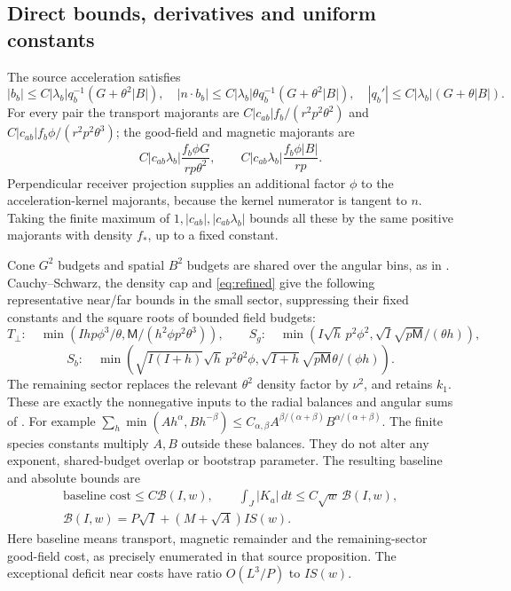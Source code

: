 \documentclass[11pt]{article}
\theoremstyle{remark}\newtheorem{remark}[theorem]{Remark}
\numberwithin{equation}{section}
\begin{document}
\subsection{Direct bounds, derivatives and uniform constants}
The source acceleration satisfies
\[
 |b_b|\le C|\lambda_b|q_b^{-1}(G+\theta^2|B|),\quad
 |n\cdot b_b|\le C|\lambda_b|\theta q_b^{-1}(G+\theta^2|B|),\quad
 |q_b'|\le C|\lambda_b|(G+\theta|B|).
\]
For every pair the transport majorants are
$C|c_{ab}|f_b/(r^2p^2\theta^2)$ and
$C|c_{ab}|f_b\phi/(r^2p^2\theta^3)$; the good-field and magnetic
majorants are
\begin{equation}\label{eq:maj}
 C|c_{ab}\lambda_b|\frac{f_b\phi G}{rp\theta^2},\qquad
 C|c_{ab}\lambda_b|\frac{f_b\phi|B|}{rp}.
\end{equation}
Perpendicular receiver projection supplies an additional factor $\phi$
to the acceleration-kernel majorants, because the kernel numerator is
tangent to $n$. Taking the finite maximum of
$1,|c_{ab}|,|c_{ab}\lambda_b|$ bounds all these by the same positive
majorants with density $f_*$, up to a fixed constant.

Cone $G^2$ budgets and spatial $B^2$ budgets are shared over the angular
bins, as in \cite[Section 5]{OAI362}. Cauchy--Schwarz, the density cap and
\eqref{eq:refined} give the following representative near/far bounds
in the small sector, suppressing their fixed constants and the square
roots of bounded field budgets:
\[
 T_\perp:\quad \min(Ihp\phi^3/\theta,
                  \mathsf M/(h^2\phi p^2\theta^3)),\qquad
 S_g:\quad\min(I\sqrt h\,p^2\phi^2,
                \sqrt I\sqrt{p\mathsf M}/(\theta h)),
\]
\[
 S_b:\quad\min(\sqrt{I(I+h)}\sqrt h\,p^2\theta^2\phi,
        \sqrt{I+h}\sqrt{p\mathsf M}\theta/(\phi h)).
\]
The remaining sector replaces the relevant $\theta^2$ density factor
by $\nu^2$, and retains $k_1$. These are exactly the nonnegative inputs
to the radial balances and angular sums of \cite[Section 5]{OAI362}.
For example $\sum_h\min(Ah^\alpha,Bh^{-\beta})
\le C_{\alpha,\beta}A^{\beta/(\alpha+\beta)}B^{\alpha/(\alpha+\beta)}$.
The finite species constants multiply $A,B$ outside these balances.
They do not alter any exponent, shared-budget overlap or bootstrap parameter.
The resulting baseline and absolute bounds are
\begin{equation}\label{eq:direct}
 \begin{gathered}
 \text{baseline cost}\le C\mathcal B(I,w),\qquad
 \int_J|K_a|\,dt\le C\sqrt w\,\mathcal B(I,w),\\
 \mathcal B(I,w)=P\sqrt I+(M+\sqrt A)IS(w).
 \end{gathered}
\end{equation}
Here baseline means transport, magnetic remainder and the remaining-sector
good-field cost, as precisely enumerated in that source proposition.
The exceptional deficit near costs have ratio $O(L^3/P)$ to $IS(w)$.
\end{document}
